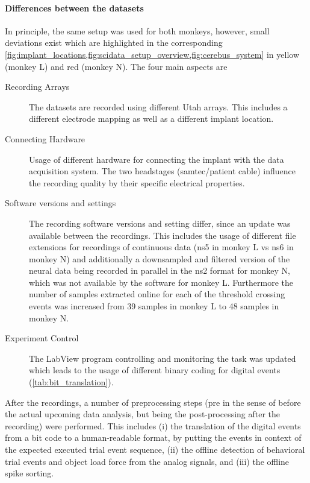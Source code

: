 \paragraph{Differences between the datasets}
In principle, the same setup was used for both monkeys, however, small deviations exist which are highlighted in the corresponding \cref{fig:implant_locations,fig:scidata_setup_overview,fig:cerebus_system} in yellow (monkey L) and red (monkey N). The four main aspects are
\begin{description}
 \item[Recording Arrays] The datasets are recorded using different Utah arrays. This includes a different electrode mapping as well as a different implant location.
 \item[Connecting Hardware] Usage of different hardware for connecting the implant with the data acquisition system. The two headstages (samtec/patient cable) influence the recording quality by their specific electrical properties.
 \item[Software versions and settings] The recording software versions and setting differ, since an update was available between the recordings. This includes the usage of different file extensions for recordings of continuous data (ns5 in monkey L vs ns6 in monkey N) and additionally a downsampled and filtered version of the neural data being recorded in parallel in the ns2 format for monkey N, which was not available by the software for monkey L. Furthermore the number of samples extracted online for each of the threshold crossing events was increased from 39 samples in monkey L to 48 samples in monkey N.
 \item[Experiment Control] The LabView program controlling and monitoring the task was updated which leads to the usage of different binary coding for digital events (\cref{tab:bit_translation}). 
\end{description}

After the recordings, a number of preprocessing steps (pre in the sense of before the actual upcoming data analysis, but being the post-processing after the recording) were performed. This includes (i) the translation of the digital events from a bit code to a human-readable format, by putting the events in context of the expected executed trial event sequence, (ii) the offline detection of behavioral trial events and object load force from the analog signals, and (iii) the offline spike sorting.

